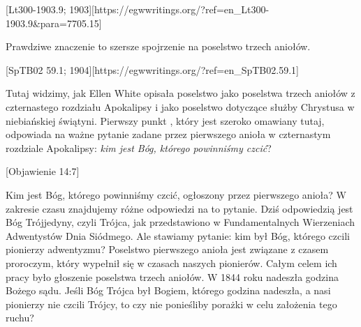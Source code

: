  \label{chap:remembering-the-beginning}

[Lt300-1903.9; 1903][https://egwwritings.org/?ref=en\_Lt300-1903.9&para=7705.15]

Prawdziwe znaczenie  to szersze spojrzenie na poselstwo trzech aniołów.

[SpTB02 59.1; 1904][https://egwwritings.org/?ref=en\_SpTB02.59.1]

Tutaj widzimy, jak Ellen White opisała poselstwo  jako poselstwa trzech aniołów z czternastego rozdziału Apokalipsy i jako poselstwo dotyczące służby Chrystusa w niebiańskiej świątyni. Pierwszy punkt , który jest szeroko omawiany tutaj, odpowiada na ważne pytanie zadane przez pierwszego anioła w czternastym rozdziale Apokalipsy: \textit{kim jest Bóg, którego powinniśmy czcić}?

[Objawienie 14:7]

Kim jest Bóg, którego powinniśmy czcić, ogłoszony przez pierwszego anioła? W zakresie czasu znajdujemy różne odpowiedzi na to pytanie. Dziś odpowiedzią jest Bóg Trójjedyny, czyli Trójca, jak przedstawiono w Fundamentalnych Wierzeniach Adwentystów Dnia Siódmego. Ale stawiamy pytanie: kim był Bóg, którego czcili pionierzy adwentyzmu? Poselstwo pierwszego anioła jest związane z czasem proroczym, który wypełnił się w czasach naszych pionierów. Całym celem ich pracy było głoszenie poselstwa trzech aniołów. W 1844 roku nadeszła godzina Bożego sądu. Jeśli Bóg Trójca był Bogiem, którego godzina nadeszła, a nasi pionierzy nie czcili Trójcy, to czy nie ponieśliby porażki w celu założenia tego ruchu?

